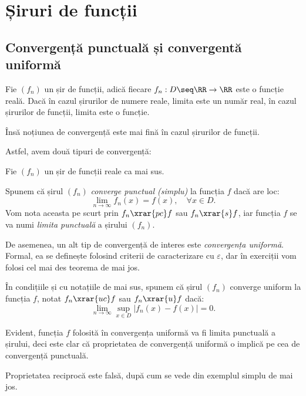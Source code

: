 
\chapter{Șiruri de funcții}

\section{Convergență punctuală și convergentă uniformă}

Fie $ (f_n) $ un șir de funcții, adică fiecare $ f_n : D \seq \RR \to \RR $
este o funcție reală. Dacă în cazul șirurilor de numere reale, limita este un
număr real, în cazul șirurilor de funcții, limita este o funcție.

Însă noțiunea de convergență este mai fină în cazul șirurilor de funcții.

Astfel, avem două tipuri de convergență:
\begin{definition}\label{def:conv-punct}
    Fie $ (f_n) $ un șir de funcții reale ca mai sus.

    Spunem că șirul $ (f_n) $ \emph{converge punctual (simplu)} la funcția $ f $
    dacă are loc:
    \[
        \lim_{n \to \infty} f_n(x) = f(x), \quad \forall x \in D.
    \]
    Vom nota aceasta pe scurt prin $ f_n \xrar{pc} f $ sau $ f_n \xrar{s} f $,
    iar funcția $ f $ se va numi \emph{limita punctuală} a șirului $ (f_n) $.
\end{definition}

De asemenea, un alt tip de convergență de interes este \emph{convergența uniformă}.
Formal, ea se definește folosind criterii de caracterizare cu $ \varepsilon $, dar în
exerciții vom folosi cel mai des teorema de mai jos.
\begin{theorem}\label{thm:conv-unif}
    În condițiile și cu notațiile de mai sus, spunem că șirul $ (f_n) $ converge
    uniform la funcția $ f $, notat $ f_n \xrar{uc} f $ sau $ f_n \xrar{u} f $
    dacă:
    \[
        \lim_{n \to \infty} \sup_{x \in D} |f_n(x) - f(x)| = 0.
    \]
\end{theorem}

Evident, funcția $ f $ folosită în convergența uniformă va fi limita punctuală
a șirului, deci este clar că proprietatea de convergență uniformă o implică
pe cea de convergență punctuală.

Proprietatea reciprocă este falsă, după cum se vede din exemplul simplu
de mai jos.

